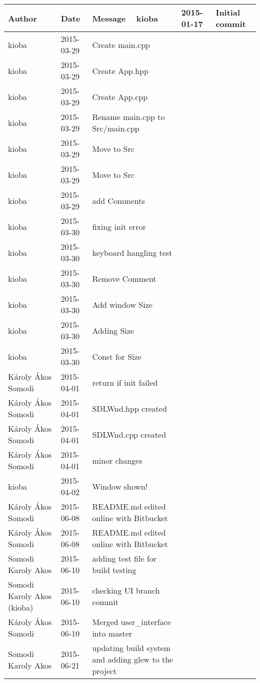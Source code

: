 \begin{center}
\begin{longtabu} to \textwidth {|
    X[4,l]|
    X[3,c]|
    X[8,l]|}
    \hline
    \textbf{Author} & \textbf{Date} & \textbf{Message} \ \hline
kioba & 2015-01-17 & Initial commit \\ \hline
kioba & 2015-03-29 & Create main.cpp \\ \hline
kioba & 2015-03-29 & Create App.hpp \\ \hline
kioba & 2015-03-29 & Create App.cpp \\ \hline
kioba & 2015-03-29 & Rename main.cpp to Src/main.cpp \\ \hline
kioba & 2015-03-29 & Move to Src \\ \hline
kioba & 2015-03-29 & Move to Src \\ \hline
kioba & 2015-03-29 & add Comments \\ \hline
kioba & 2015-03-30 & fixing init error \\ \hline
kioba & 2015-03-30 & keyboard hangling test \\ \hline
kioba & 2015-03-30 & Remove Comment \\ \hline
kioba & 2015-03-30 & Add window Size \\ \hline
kioba & 2015-03-30 & Adding Size \\ \hline
kioba & 2015-03-30 & Const for Size \\ \hline
Károly Ákos Somodi & 2015-04-01 & return if init failed \\ \hline
Károly Ákos Somodi & 2015-04-01 & SDLWnd.hpp created \\ \hline
Károly Ákos Somodi & 2015-04-01 & SDLWnd.cpp created \\ \hline
Károly Ákos Somodi & 2015-04-01 & minor changes \\ \hline
kioba & 2015-04-02 & Window shown! \\ \hline
Károly Ákos Somodi & 2015-06-08 & README.md edited online with Bitbucket \\ \hline
Károly Ákos Somodi & 2015-06-08 & README.md edited online with Bitbucket \\ \hline
Somodi Karoly Akos & 2015-06-10 & adding test file for build testing \\ \hline
Somodi Karoly Akos (kioba) & 2015-06-10 & checking UI branch commit \\ \hline
Károly Ákos Somodi & 2015-06-10 & Merged user\_interface into master \\ \hline
Somodi Karoly Akos & 2015-06-21 & updating build system and adding glew to the project \\ \hline

\end{longtabu}
\end{center}
